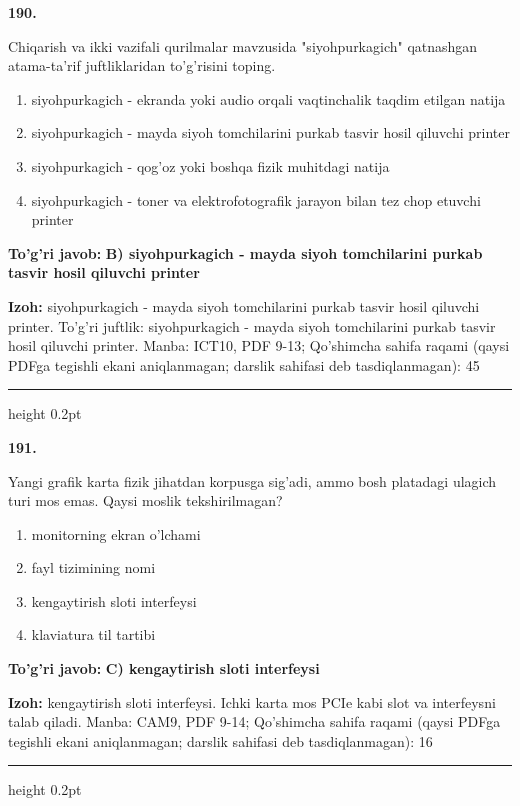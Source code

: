 \documentclass[10pt,a4paper]{article}
\begin{document}
{\bfseries\sffamily\color{ink} 190.}
\par
Chiqarish va ikki vazifali qurilmalar mavzusida "siyohpurkagich" qatnashgan atama-ta'rif juftliklaridan to'g'risini toping.
\begin{enumerate}[label=\Alph*),leftmargin=9mm]
\item siyohpurkagich - ekranda yoki audio orqali vaqtinchalik taqdim etilgan natija
\item siyohpurkagich - mayda siyoh tomchilarini purkab tasvir hosil qiluvchi printer
\item siyohpurkagich - qog'oz yoki boshqa fizik muhitdagi natija
\item siyohpurkagich - toner va elektrofotografik jarayon bilan tez chop etuvchi printer
\end{enumerate}
\begin{tcolorbox}[enhanced,breakable,colback=teal!4,colframe=teal!60!black,boxrule=0.45pt,arc=1.2mm,left=2.7mm,right=2.7mm,top=1.8mm,bottom=1.8mm,before skip=2mm,after skip=2mm]
{\bfseries\sffamily\color{teal}To'g'ri javob:} \textbf{B) siyohpurkagich - mayda siyoh tomchilarini purkab tasvir hosil qiluvchi printer}
\par\smallskip
{\bfseries Izoh:} siyohpurkagich - mayda siyoh tomchilarini purkab tasvir hosil qiluvchi printer. To'g'ri juftlik: siyohpurkagich - mayda siyoh tomchilarini purkab tasvir hosil qiluvchi printer. Manba: ICT10, PDF 9-13; Qo'shimcha sahifa raqami (qaysi PDFga tegishli ekani aniqlanmagan; darslik sahifasi deb tasdiqlanmagan): 45
\end{tcolorbox}
\vspace{2mm}\hrule height 0.2pt\vspace{3mm}

{\bfseries\sffamily\color{ink} 191.}
\par
Yangi grafik karta fizik jihatdan korpusga sig'adi, ammo bosh platadagi ulagich turi mos emas. Qaysi moslik tekshirilmagan?
\begin{enumerate}[label=\Alph*),leftmargin=9mm]
\item monitorning ekran o'lchami
\item fayl tizimining nomi
\item kengaytirish sloti interfeysi
\item klaviatura til tartibi
\end{enumerate}
\begin{tcolorbox}[enhanced,breakable,colback=teal!4,colframe=teal!60!black,boxrule=0.45pt,arc=1.2mm,left=2.7mm,right=2.7mm,top=1.8mm,bottom=1.8mm,before skip=2mm,after skip=2mm]
{\bfseries\sffamily\color{teal}To'g'ri javob:} \textbf{C) kengaytirish sloti interfeysi}
\par\smallskip
{\bfseries Izoh:} kengaytirish sloti interfeysi. Ichki karta mos PCIe kabi slot va interfeysni talab qiladi. Manba: CAM9, PDF 9-14; Qo'shimcha sahifa raqami (qaysi PDFga tegishli ekani aniqlanmagan; darslik sahifasi deb tasdiqlanmagan): 16
\end{tcolorbox}
\vspace{2mm}\hrule height 0.2pt\vspace{3mm}
\end{document}
